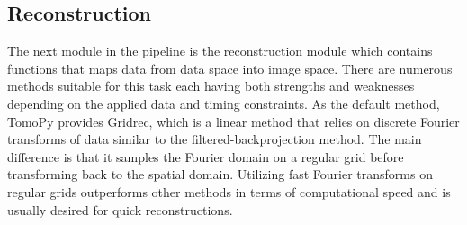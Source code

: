 \documentclass[pdf]{iucr}              %
\begin{document}
%
%
%
%
%
%
%
%
%

\subsection{Reconstruction}

The next module in the pipeline is the reconstruction module which contains functions that maps data from data space into image space. There are numerous methods suitable for this task each having both strengths and weaknesses depending on the applied data and timing constraints. As the default method, TomoPy provides Gridrec, which is a linear method that relies on discrete Fourier transforms of data similar to the filtered-backprojection method. The main difference is that it samples the Fourier domain on a regular grid before transforming back to the spatial domain. Utilizing fast Fourier transforms on regular grids outperforms other methods in terms of computational speed and is usually desired for quick reconstructions.
\end{document}
